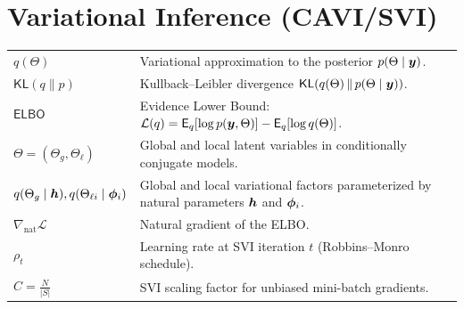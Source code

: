 \vspace{0.5em}
\section*{Variational Inference (CAVI/SVI)}
\begin{tabularx}{\textwidth}{>{\raggedright\arraybackslash}p{4cm} X}
$q(\Theta)$ & Variational approximation to the posterior $p(\Theta\mid\bm{y})$. \\
$\mathsf{KL}\!\left(q\parallel p\right)$ & Kullback--Leibler divergence $\mathsf{KL}\!\left(q(\Theta)\,\|\,p(\Theta\mid\bm{y})\right)$. \\
$\mathsf{ELBO}$ & Evidence Lower Bound: $\mathcal{L}(q)=\mathsf{E}_q\!\left[\log p(\bm{y},\Theta)\right]-\mathsf{E}_q\!\left[\log q(\Theta)\right]$. \\
$\Theta=(\Theta_g,\Theta_\ell)$ & Global and local latent variables in conditionally conjugate models. \\
$q(\Theta_g\mid \bm{h}),q(\Theta_{\ell i}\mid\bm{\phi}_i)$ & Global and local variational factors parameterized by natural parameters $\bm{h}$ and $\bm{\phi}_i$. \\
$\nabla_{\text{nat}} \mathcal{L}$ & Natural gradient of the ELBO. \\
$\rho_t$ & Learning rate at SVI iteration $t$ (Robbins--Monro schedule). \\
$C=\frac{N}{|S|}$ & SVI scaling factor for unbiased mini-batch gradients. \\
\end{tabularx}

\vspace{0.5em}

